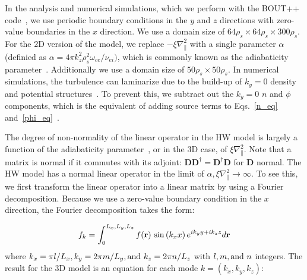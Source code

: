 \documentclass[twocolumn,showkeys,superscriptaddress]{revtex4}
\def\beq{\begin{equation}}
\def\eeq{\end{equation}}
\def\grad{\nabla}
\newcommand{\gradpar}{\grad_\parallel}
\begin{document}
In the analysis and numerical simulations, which we perform with the BOUT++ code~\cite{dudson2009}, we use periodic boundary conditions in
the $y$ and $z$ directions with zero-value boundaries in the $x$ direction. We use a domain size of $64 \rho_s \times 64 \rho_s \times 300 \rho_s$.
For the 2D version of the model, we replace $-\xi \gradpar^2$ with a single parameter $\alpha$ (definied as $\alpha = 4 \pi k_z^2 \rho_s^2 \omega_{ce} /\nu_{ei})$, 
which is commonly known as the adiabaticity parameter~\cite{camargo1995,camargo1998}. Additionally we use a domain size of $50 \rho_s \times 50 \rho_s$.
In numerical simulations, the turbulence can laminarize due to the build-up of $k_y=0$ density and potential structures~\cite{biskamp1995}. To prevent this, we subtract out the $k_y=0$
$n$ and $\phi$ components, which is the equivalent of adding source terms to Eqs.~\ref{n_eq} and~\ref{phi_eq}~\cite{friedman2012b}.

The degree of non-normality of the linear operator in the HW model is largely a function of the adiabaticity parameter~\cite{camargo1998}, or in the 3D case, of $\xi \gradpar^2$. 
Note that a matrix is normal if it commutes with its adjoint: $\mathbf{D} \mathbf{D}^\dagger = \mathbf{D}^\dagger \mathbf{D}$ for $\mathbf{D}$ normal. 
The HW model has a normal linear operator in the limit of $\alpha, \xi \gradpar^2 \to \infty$. 
To see this, we first transform the linear operator into a linear matrix by using a Fourier decomposition. Because we use a zero-value boundary condition in the $x$ direction, the
Fourier decomposition takes the form:

\beq
\label{fourier_form}
f_k = \int_0^{L_x,L_y,L_z} f(\mathbf{r}) \ {\rm sin} \left( k_x x \right) e^{i k_y y + i k_z z} d\mathbf{r}
\eeq
where $k_x = \pi l/L_x, k_y = 2 \pi m/L_y, {\rm and } \ k_z = 2 \pi n/L_z$ with $l, m, {\rm and } \ n$ integers.
The result for the 3D model is an equation for each mode $k = (k_x,k_y,k_z)$:
\end{document}
